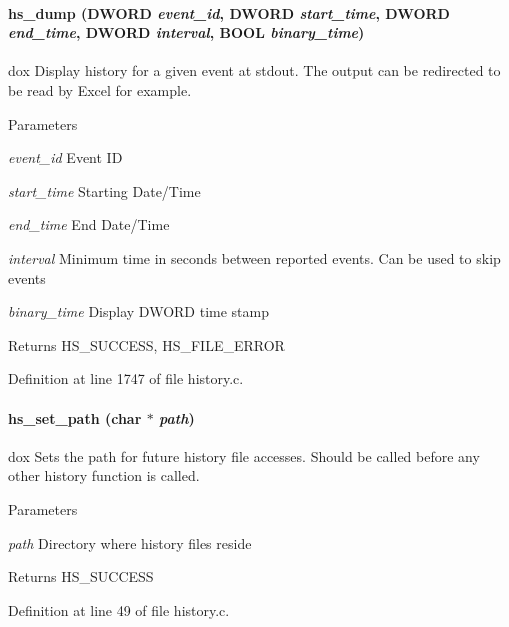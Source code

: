 \paragraph[{hs\_\-dump}]{ hs\_\-dump ({\bf DWORD} {\em event\_\-id}, \/  {\bf DWORD} {\em start\_\-time}, \/  {\bf DWORD} {\em end\_\-time}, \/  {\bf DWORD} {\em interval}, \/  {\bf BOOL} {\em binary\_\-time})}\hfill\label{group__hsfunctioncode_gaa0adfd626d570a1e37a01f2f8b8afdfd}
dox Display history for a given event at stdout. The output can be redirected to be read by Excel for example. 
\begin{DoxyParams}{Parameters}
\item[{\em event\_\-id}]Event ID \item[{\em start\_\-time}]Starting Date/Time \item[{\em end\_\-time}]End Date/Time \item[{\em interval}]Minimum time in seconds between reported events. Can be used to skip events \item[{\em binary\_\-time}]Display DWORD time stamp \end{DoxyParams}
\begin{DoxyReturn}{Returns}
HS\_\-SUCCESS, HS\_\-FILE\_\-ERROR 
\end{DoxyReturn}


Definition at line 1747 of file history.c.
\paragraph[{hs\_\-set\_\-path}]{ hs\_\-set\_\-path (char $\ast$ {\em path})}\hfill\label{group__hsfunctioncode_gadd381765666fd1aa3395b63b86d44887}
dox Sets the path for future history file accesses. Should be called before any other history function is called. 
\begin{DoxyParams}{Parameters}
\item[{\em path}]Directory where history files reside \end{DoxyParams}
\begin{DoxyReturn}{Returns}
HS\_\-SUCCESS 
\end{DoxyReturn}


Definition at line 49 of file history.c.